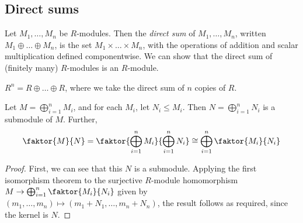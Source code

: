 \subsection{Direct sums}
\begin{definition}
	Let \( M_1, \dots, M_n \) be \( R \)-modules.
	Then the \textit{direct sum} of \( M_1, \dots, M_n \), written \( M_1 \oplus \dots \oplus M_n \), is the set \( M_1 \times \dots \times M_n \), with the operations of addition and scalar multiplication defined componentwise.
	We can show that the direct sum of (finitely many) \( R \)-modules is an \( R \)-module.
\end{definition}
\begin{example}
	\( R^n = R \oplus \dots \oplus R \), where we take the direct sum of \( n \) copies of \( R \).
\end{example}
\begin{lemma}
	Let \( M = \bigoplus_{i=1}^n M_i \), and for each \( M_i \), let \( N_i \leq M_i \).
	Then \( N = \bigoplus_{i=1}^n N_i \) is a submodule of \( M \).
	Further,
	\[
		\faktor{M}{N} = \faktor{\bigoplus_{i=1}^n M_i}{\bigoplus_{i=1}^n N_i} \cong \bigoplus_{i=1}^n \faktor{M_i}{N_i}
	\]
\end{lemma}
\begin{proof}
	First, we can see that this \( N \) is a submodule.
	Applying the first isomorphism theorem to the surjective \( R \)-module homomorphism \( M \to \bigoplus_{i=1}^n \faktor{M_i}{N_i} \) given by \( (m_1, \dots, m_n) \mapsto (m_1 + N_1, \dots, m_n + N_n) \), the result follows as required, since the kernel is \( N \).
\end{proof}


